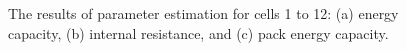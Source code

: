 \documentclass[10pt,twocolumn]{IEEEtran}
\begin{document}
\begin{figure}
\centering
\vspace{-0.2cm}
{} \vspace{-0.3cm}
\caption{The results of parameter estimation  for  cells 1 to 12:  (a) energy capacity, (b) internal resistance, and (c) pack energy capacity.}
\vspace{-0.5cm}
\label{fig:cell_removal1}
\end{figure}


%
\vspace{-0.3cm}
\end{document}
